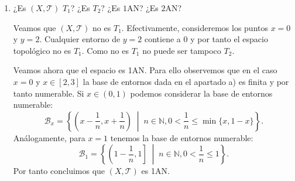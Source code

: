 \documentclass[12pt]{article}
\begin{document}
\begin{ejercicio}
\begin{enumerate}[label=\alph*)]
                Veamos ahora que $\text{int}(B_2)=\{0\}\cup([2,3]\cap\mathbb{Q})$. Observemos que para cada $x\in [2,3]\cap\mathbb{Q}$, $x\in\{0,x\}\subset\{0\}\cup([2,3]\cap\mathbb{Q})$, luego es entorno de todos sus puntos y por tanto $\{0\}\cup([2,3]\cap\mathbb{Q})$ es abierto. Como $\text{int}(B_2)$ es el abierto más grande contenido en $B_2$ tenemos $\{0\}\cup([2,3]\cap\mathbb{Q})\subset \text{int}(B_2)$. Por otra parte, si $x\in(0,1]\cap\mathbb{Q}$ es fácil comprobar que $x\notin \text{int}(B_2)$ ya que cualquier entorno básico de $x$ de la forma $(x-\epsilon,x+\epsilon)$ contiene números irracionales y por tanto nunca puede estar contenido en $B_2$. Concluimos por tanto que $\text{int}(B_2)=\{0\}\cup([2,3]\cap\mathbb{Q})$.
        
                Veamos ahora que $B_2$ es denso, es decir $\text{cl}(B_2)=X$. De hecho si consideramos $x\in(0,1)$, sea racional o irracional, tenemos que cualquiera de sus entornos básicos $(x-\epsilon,x+\epsilon)$, $0<\epsilon\le \min\{x,1-x\}$ contiene números racionales y por tanto $x\in \text{cl}(B_2)$. Análogamente si $x\in[2,3]$, sea racional o irracional, su entorno básico $\{0,x\}$ contiene al $0$ que es un número racional y por tanto $x\in \text{cl}(B_2)$. Concluimos entonces que $\text{cl}(B_2)=X$.
            
            \item ¿Es $(X, \mathcal{T})$ $T_1$? ¿Es $T_2$? ¿Es $1\text{AN}$? ¿Es $2\text{AN}$?

                Veamos que $(X,\mathcal{T})$ no es $T_1$. Efectivamente, consideremos los puntos $x=0$ y $y=2$. Cualquier entorno de $y=2$ contiene a $0$ y por tanto el espacio topológico no es $T_1$. Como no es $T_1$ no puede ser tampoco $T_2$.

                Veamos ahora que el espacio es 1AN. Para ello observemos que en el caso $x=0$ y $x\in[2,3]$ la base de entornos dada en el apartado a) es finita y por tanto numerable. Si $x\in(0,1)$ podemos considerar la base de entornos numerable:
                \[
                \mathcal{B}_x=\left\{\left(x-\frac{1}{n},x+\frac{1}{n}\right) \;\middle|\; n\in\mathbb{N}, 0<\frac{1}{n}\le \min\{x,1-x\}\right\}.
                \]
                Análogamente, para $x=1$ tenemos la base de entornos numerable:
                \[
                \mathcal{B}_1=\left\{\left(1-\frac{1}{n},1\right] \;\middle|\; n\in\mathbb{N}, 0<\frac{1}{n}\le 1\right\}.
                \]
                Por tanto concluimos que $(X,\mathcal{T})$ es 1AN.
        

\end{enumerate}
\end{ejercicio}
\end{document}
